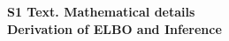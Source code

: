 \documentclass[10pt,letterpaper]{article}
\date{}
\begin{document}
\vspace*{0.35in}

\begin{flushleft}
{\Large
\textbf{S1 Text. Mathematical details\\}
\bigskip
\textbf{Derivation of ELBO and Inference} %
}
\newline

%
%




\end{flushleft}
\label{supplement:1}
\end{document}

